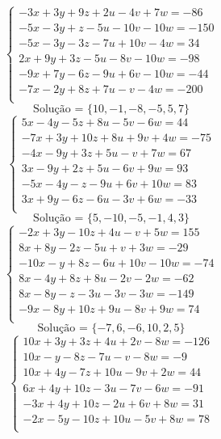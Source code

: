 \documentclass[12pt,oneside,a4paper]{article}
\begin{document}
\vspace{\baselineskip}
\begin{equation*}
\begin{cases}
-3x+3y+9z+2u-4v+7w=-86 \\
-5x-3y+z-5u-10v-10w=-150 \\
-5x-3y-3z-7u+10v-4w=34 \\
2x+9y+3z-5u-8v-10w=-98 \\
-9x+7y-6z-9u+6v-10w=-44 \\
-7x-2y+8z+7u-v-4w=-200 \\
\end{cases}
\end{equation*}
\begin{equation*}
\text{Solução = }\{10,-1,-8,-5,5,7\}
\end{equation*}
\vspace{\baselineskip}
\begin{equation*}
\begin{cases}
5x-4y-5z+8u-5v-6w=44 \\
-7x+3y+10z+8u+9v+4w=-75 \\
-4x-9y+3z+5u-v+7w=67 \\
3x-9y+2z+5u-6v+9w=93 \\
-5x-4y-z-9u+6v+10w=83 \\
3x+9y-6z-6u-3v+6w=-33 \\
\end{cases}
\end{equation*}
\begin{equation*}
\text{Solução = }\{5,-10,-5,-1,4,3\}
\end{equation*}
\vspace{\baselineskip}
\begin{equation*}
\begin{cases}
-2x+3y-10z+4u-v+5w=155 \\
8x+8y-2z-5u+v+3w=-29 \\
-10x-y+8z-6u+10v-10w=-74 \\
8x-4y+8z+8u-2v-2w=-62 \\
8x-8y-z-3u-3v-3w=-149 \\
-9x-8y+10z+9u-8v+9w=74 \\
\end{cases}
\end{equation*}
\begin{equation*}
\text{Solução = }\{-7,6,-6,10,2,5\}
\end{equation*}
\vspace{\baselineskip}
\begin{equation*}
\begin{cases}
10x+3y+3z+4u+2v-8w=-126 \\
10x-y-8z-7u-v-8w=-9 \\
10x+4y-7z+10u-9v+2w=44 \\
6x+4y+10z-3u-7v-6w=-91 \\
-3x+4y+10z-2u+6v+8w=31 \\
-2x-5y-10z+10u-5v+8w=78 \\
\end{cases}
\end{equation*}
\end{document}
